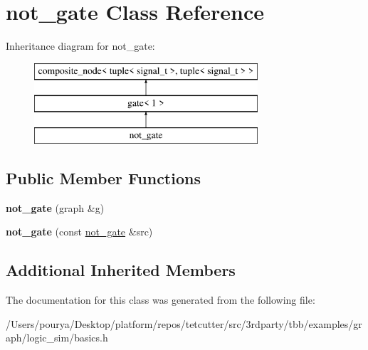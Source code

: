 \hypertarget{classnot__gate}{}\section{not\+\_\+gate Class Reference}
\label{classnot__gate}
Inheritance diagram for not\+\_\+gate\+:\begin{figure}[H]
\begin{center}
\leavevmode
\includegraphics[height=3.000000cm]{classnot__gate}
\end{center}
\end{figure}
\subsection*{Public Member Functions}
\begin{DoxyCompactItemize}
\item 
\hypertarget{classnot__gate_a16bb1ade659ef540416c9aa13cd8eb65}{}{\bfseries not\+\_\+gate} (graph \&g)\label{classnot__gate_a16bb1ade659ef540416c9aa13cd8eb65}

\item 
\hypertarget{classnot__gate_a34b69670100784d42ef4b06f205bafdd}{}{\bfseries not\+\_\+gate} (const \hyperlink{classnot__gate}{not\+\_\+gate} \&src)\label{classnot__gate_a34b69670100784d42ef4b06f205bafdd}

\end{DoxyCompactItemize}
\subsection*{Additional Inherited Members}


The documentation for this class was generated from the following file\+:\begin{DoxyCompactItemize}
\item 
/\+Users/pourya/\+Desktop/platform/repos/tetcutter/src/3rdparty/tbb/examples/graph/logic\+\_\+sim/basics.\+h\end{DoxyCompactItemize}
